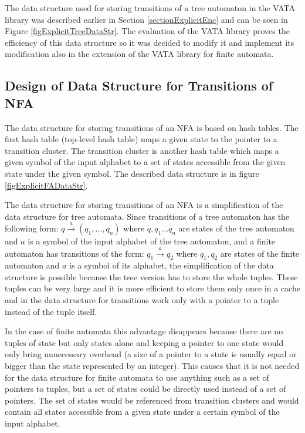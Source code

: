 The data structure used for storing transitions of a tree automaton in the VATA library was described earlier in Section \ref{sectionExplicitEnc} and can be seen
in Figure \ref{figExplicitTreeDataStr}. The evaluation of the VATA library \cite{libvata} proves the efficiency of this data structure so it was
decided to modify it and implement its modification also in the extension of the VATA library for finite automata.

\subsection{Design of Data Structure for Transitions of NFA}
The data structure for storing transitions of an NFA is based on hash tables. The first hash table (top-level hash table) maps a given state to the pointer to
a transition cluster. The transition cluster is another hash table which maps a given symbol of the input alphabet to a set of states accessible from
the given state under the given symbol. 
The described data structure is in figure \ref{figExplicitFADataStr}.

The data structure for storing transitions of an NFA is a simplification of the data structure for tree automata. Since transitions of a tree automaton
has the following form: $q \xrightarrow{a} (q_1,\ldots,q_n)$ where $q,q_1\ldots q_n$ are states of the tree automaton and $a$ is a symbol of 
the input alphabet of the tree automaton, and a finite automaton has transitions of the form: $q_1 \xrightarrow{a} q_2$ 
where $q_1,q_2$ are states of the finite automaton and $a$ is a symbol of its alphabet, the simplification of the data structure is possible because 
the tree version has to store the whole tuples. These tuples can be very large and it is more efficient to store them only once in a cache and 
in the data structure for transitions work only with a pointer to a tuple instead of the tuple itself. 

In the case of finite automata this advantage disappears because there are no tuples of state but only states alone and keeping a pointer to one state
would only bring unnecessary overhead 
(a size of a pointer to a state is usually equal or bigger than the state represented by an integer). This causes that it is not needed 
for the data structure for finite automata to use 
anything such as a set of pointers to tuples, but a set of states could be directly used instead of
a set of pointers. The set of states would be referenced from transition clusters and would contain all states accessible from a given state under a 
certain symbol of the input alphabet.

